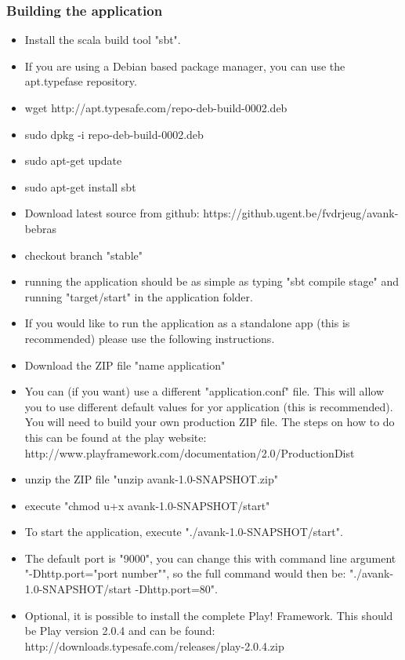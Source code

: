 \documentclass[11pt]{article}
\begin{document}
\subsubsection{Building the application}
\begin{itemize}
\item  Install the scala build tool "sbt".
\item  If you are using a Debian based package manager, you can use the apt.typefase repository.
\item  wget http://apt.typesafe.com/repo-deb-build-0002.deb
\item  sudo dpkg -i repo-deb-build-0002.deb
\item  sudo apt-get update
\item  sudo apt-get install sbt
\item  Download latest source from github: https://github.ugent.be/fvdrjeug/avank-bebras
\item  checkout branch "stable"
\item  running the application should be as simple as typing "sbt compile stage" and running "target/start" in the application folder.

\item  If you would like to run the application as a standalone app (this is recommended) please use the following instructions.
\item  Download the ZIP file "name application"
\item  You can (if you want) use a different "application.conf" file. This will allow you to use different default values for yor application (this is recommended).
       You will need to build your own production ZIP file. The steps on how to do this can be found at the play website: http://www.playframework.com/documentation/2.0/ProductionDist
\item  unzip the ZIP file "unzip avank-1.0-SNAPSHOT.zip"
\item  execute "chmod u+x avank-1.0-SNAPSHOT/start"
\item  To start the application, execute "./avank-1.0-SNAPSHOT/start".
\item  The default port is "9000", you can change this with command line argument "-Dhttp.port="port number"", so the full command would then be: "./avank-1.0-SNAPSHOT/start -Dhttp.port=80".
      
\item  Optional, it is possible to install the complete Play! Framework. This should be Play version 2.0.4 and can be found: http://downloads.typesafe.com/releases/play-2.0.4.zip
\end{itemize}
\end{document}
